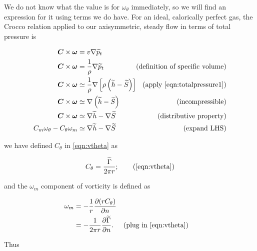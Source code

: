 We do not know what the value is for \(\omega_\theta\) immediately, so we will find an expression for it using terms we do have.
%
For an ideal, calorically perfect gas, the Crocco relation applied to our axisymmetric, steady flow in terms of total pressure is

\begin{equation}
    \label{eqn:vmomegat}
    \begin{alignedat}{2}
    \vect{C} \times \vect{\omega} &= v \nabla \widetilde{p}_t \\
    \vect{C} \times \vect{\omega} &= \frac{1}{\rho} \nabla \widetilde{p}_t & \text{(definition of specific volume)} \\
    \vect{C} \times \vect{\omega} &\simeq \frac{1}{\rho} \nabla \left[\rho\left(\widetilde{h} - \widetilde{S}\right)\right] & \text{(apply \cref{eqn:totalpressure1})} \\
    \vect{C} \times \vect{\omega} &\simeq \nabla \left(\widetilde{h} - \widetilde{S}\right)  & \text{(incompressible)} \\
    \vect{C} \times \vect{\omega} &\simeq \nabla \widetilde{h} - \nabla \widetilde{S} & \text{(distributive property)} \\
    C_m \omega_\theta - C_\theta \omega_m &\simeq \nabla \widetilde{h} - \nabla \widetilde{S} & \text{(expand LHS)} \\
    \end{alignedat}
\end{equation}

\where we have defined \(C_\theta\) in \cref{eqn:vtheta} as

\begin{equation}
    C_\theta = \frac{\widetilde{\Gamma}}{2 \pi r};
    \tag{\ref{eqn:vtheta}}
\end{equation}

\noindent and the \(\omega_m\) component of vorticity is defined as

\begin{equation}
\begin{aligned}
    \omega_m &= - \frac{1}{r} \pd{(r C_\theta)}{n} \\
             &= - \frac{1}{2 \pi r} \pd{\widetilde{\Gamma}}{n}. && \text{(plug in \cref{eqn:vtheta})}
\end{aligned}
\end{equation}

\noindent Thus

